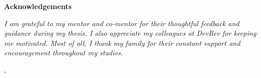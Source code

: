 \thispagestyle{empty}

\begin{center} {\Large \textbf{\sc Acknowledgements}}
\end{center}
\vspace{0.5cm}

{\it\noindent
  I am grateful to my mentor and co-mentor for their thoughtful feedback and guidance during my thesis. I
  also appreciate my colleagues at DevRev for keeping me motivated. Most of all, I thank my family for their
  constant support and encouragement throughout my studies.

  \vspace{0.5cm} \hfill \tauthor, \myyear
}
